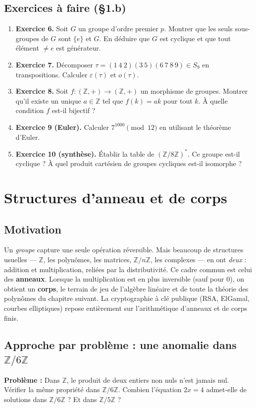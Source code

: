 \subsection{Exercices à faire (§1.b)}
\begin{enumerate}
    \item \textbf{Exercice 6.} Soit $G$ un groupe d'ordre premier $p$. Montrer que les seuls sous-groupes de $G$ sont $\{e\}$ et $G$. En déduire que $G$ est cyclique et que tout élément $\neq e$ est générateur.
    \item \textbf{Exercice 7.} Décomposer $\tau = (1\ 4\ 2)(3\ 5)(6\ 7\ 8\ 9) \in S_9$ en transpositions. Calculer $\varepsilon(\tau)$ et $o(\tau)$.
    \item \textbf{Exercice 8.} Soit $f : (\mathbb{Z}, +) \to (\mathbb{Z}, +)$ un morphisme de groupes. Montrer qu'il existe un unique $a \in \mathbb{Z}$ tel que $f(k) = ak$ pour tout $k$. À quelle condition $f$ est-il bijectif ?
    \item \textbf{Exercice 9 (Euler).} Calculer $7^{1000} \pmod{12}$ en utilisant le théorème d'Euler.
    \item \textbf{Exercice 10 (synthèse).} Établir la table de $(\mathbb{Z}/8\mathbb{Z})^*$. Ce groupe est-il cyclique ? À quel produit cartésien de groupes cycliques est-il isomorphe ?
\end{enumerate}

\section{Structures d'anneau et de corps}

\subsection{Motivation}
Un \emph{groupe} capture une seule opération réversible. Mais beaucoup de structures usuelles --- $\mathbb{Z}$, les polynômes, les matrices, $\mathbb{Z}/n\mathbb{Z}$, les complexes --- en ont \emph{deux} : addition et multiplication, reliées par la distributivité. Ce cadre commun est celui des \textbf{anneaux}. Lorsque la multiplication est en plus inversible (sauf pour $0$), on obtient un \textbf{corps}, le terrain de jeu de l'algèbre linéaire et de toute la théorie des polynômes du chapitre suivant. La cryptographie à clé publique (RSA, ElGamal, courbes elliptiques) repose entièrement sur l'arithmétique d'anneaux et de corps finis.

\subsection{Approche par problème : une anomalie dans $\mathbb{Z}/6\mathbb{Z}$}
\textbf{Problème :} Dans $\mathbb{Z}$, le produit de deux entiers non nuls n'est jamais nul. Vérifier la même propriété dans $\mathbb{Z}/6\mathbb{Z}$. Combien l'équation $2x = 4$ admet-elle de solutions dans $\mathbb{Z}/6\mathbb{Z}$ ? Et dans $\mathbb{Z}/5\mathbb{Z}$ ?

